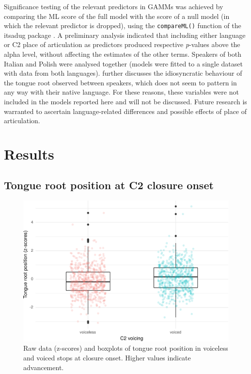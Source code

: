 \documentclass[preprint]{JASAnew}
\begin{document}
Significance testing of the relevant predictors in GAMMs was achieved by
comparing the ML score of the full model with the score of a null model
(in which the relevant predictor is dropped), using the
\texttt{compareML()} function of the itsadug package
\citep{van-rij2017}. A preliminary analysis indicated that including
either language or C2 place of articulation as predictors produced
respective \emph{p}-values above the alpha level, without affecting the
estimates of the other terms. Speakers of both Italian and Polish were
analysed together (models were fitted to a single dataset with data from
both languages).  further discusses the idiosyncratic
behaviour of the tongue root observed between speakers, which does not
seem to pattern in any way with their native language. For these
reasons, these variables were not included in the models reported here
and will not be discussed. Future research is warranted to ascertain
language-related differences and possible effects of place of
articulation.

\hypertarget{results}{%
\section{Results}\label{results}}

\label{s:results}

\hypertarget{tongue-root-position-at-c2-closure-onset}{%
\subsection{Tongue root position at C2 closure
onset}\label{tongue-root-position-at-c2-closure-onset}}

\label{s:tra-lm}

\begin{figure}
\includegraphics[width=\linewidth]{./Figure3} \caption{Raw data (z-scores) and boxplots of tongue root position in voiceless and voiced stops at closure onset. Higher values indicate advancement.}\label{f:Figure3}
\end{figure}
\end{document}
